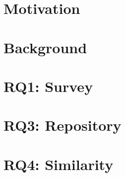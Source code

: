 \section{Motivation}




\section{Background}



\section{RQ1: Survey}



\section{RQ3: Repository}

%


\section{RQ4:  Similarity}
%

